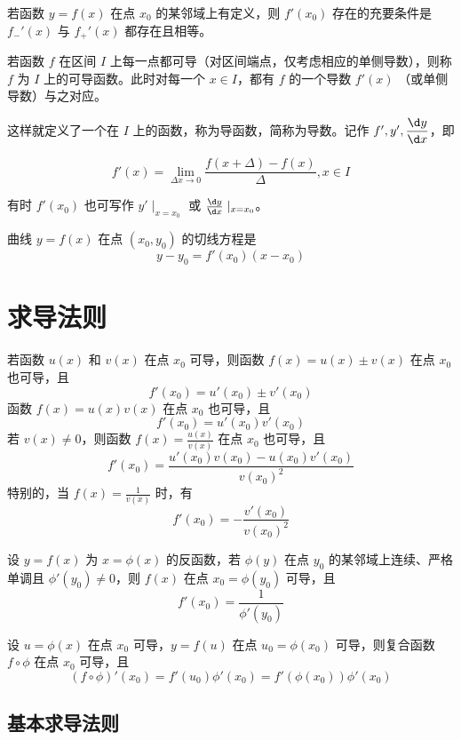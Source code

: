 \begin{theorem}
	若函数 $y=f(x)$ 在点 $x_0$ 的某邻域上有定义，则 $f'(x_0)$ 存在的充要条件是 $f_-'(x)$ 与 $f_+'(x)$ 都存在且相等。
\end{theorem}

若函数 $f$ 在区间 $I$ 上每一点都可导（对区间端点，仅考虑相应的单侧导数），则称 $f$ 为 $I$ 上的可导函数。此时对每一个 $x\in I$，都有 $f$ 的一个导数 $f'(x)$ （或单侧导数）与之对应。

这样就定义了一个在 $I$ 上的函数，称为导函数，简称为导数。记作 $f',y',\dfrac{\d y}{\d x}$，即

\[ f'(x) = \lim_{\Delta x \to 0}\frac{f(x+\Delta)-f(x)}{\Delta},x\in I \]

有时 $f'(x_0)$ 也可写作 $y'\mid_{x=x_0}$ 或 $\frac{\d y}{\d x}\mid_{x=x_0}$。

曲线 $y = f(x)$ 在点 $(x_0,y_0)$ 的切线方程是
\[ y-y_0 = f'(x_0)(x-x_0) \]

\section{求导法则}

\begin{theorem}
	若函数 $u(x)$ 和 $v(x)$ 在点 $x_0$ 可导，则函数 $f(x)=u(x)\pm v(x)$ 在点 $x_0$ 也可导，且
	\[ f'(x_0) = u'(x_0)\pm v'(x_0) \]
	函数 $f(x)=u(x)v(x)$ 在点 $x_0$ 也可导，且
	\[ f'(x_0) = u'(x_0)v'(x_0) \]
	若 $v(x)\ne 0$，则函数 $f(x)=\frac{u(x)}{v(x)}$ 在点 $x_0$ 也可导，且
	\[ f'(x_0) = \frac{u'(x_0)v(x_0)-u(x_0)v'(x_0)}{v(x_0)^2} \]
	特别的，当 $f(x) = \frac{1}{v(x)}$ 时，有
	\[ f'(x_0) = -\frac{v'(x_0)}{v(x_0)^2} \]
\end{theorem}

\begin{theorem}
	设 $y=f(x)$ 为 $x=\phi(x)$ 的反函数，若 $\phi(y)$ 在点 $y_0$ 的某邻域上连续、严格单调且 $\phi'(y_0)\ne0$，则 $f(x)$ 在点 $x_0=\phi(y_0)$ 可导，且
	\[ f'(x_0)=\frac{1}{\phi'(y_0)} \]
\end{theorem}

\begin{theorem}
	设 $u=\phi(x)$ 在点 $x_0$ 可导，$y=f(u)$ 在点 $u_0=\phi(x_0)$ 可导，则复合函数 $f\circ \phi$ 在点 $x_0$ 可导，且
	\[ (f\circ \phi)'(x_0) = f'(u_0)\phi'(x_0) = f'(\phi(x_0))\phi'(x_0) \]
\end{theorem}

\subsection{基本求导法则}

